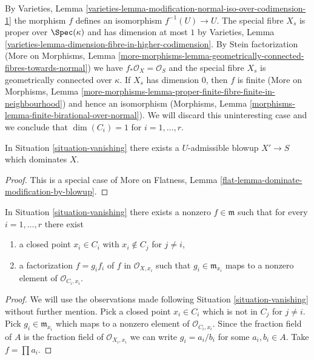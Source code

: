 \noindent
By Varieties, Lemma
\ref{varieties-lemma-modification-normal-iso-over-codimension-1}
the morphism $f$ defines an isomorphism $f^{-1}(U) \to U$.
The special fibre $X_s$ is proper over $\Spec(\kappa)$ and
has dimension at most $1$ by Varieties, Lemma
\ref{varieties-lemma-dimension-fibre-in-higher-codimension}.
By Stein factorization (More on Morphisms, Lemma
\ref{more-morphisms-lemma-geometrically-connected-fibres-towards-normal})
we have $f_*\mathcal{O}_X = \mathcal{O}_S$ and
the special fibre $X_s$ is geometrically connected over $\kappa$.
If $X_s$ has dimension $0$, then $f$ is finite
(More on Morphisms, Lemma
\ref{more-morphisms-lemma-proper-finite-fibre-finite-in-neighbourhood})
and hence an isomorphism
(Morphisms, Lemma \ref{morphisms-lemma-finite-birational-over-normal}).
We will discard this uninteresting case and we conclude that
$\dim(C_i) = 1$ for $i = 1, \ldots, r$.

\begin{lemma}
\label{lemma-dominate-by-scheme-modification}
In Situation \ref{situation-vanishing} there exists a $U$-admissible
blowup $X' \to S$ which dominates $X$.
\end{lemma}

\begin{proof}
This is a special case of
More on Flatness, Lemma \ref{flat-lemma-dominate-modification-by-blowup}.
\end{proof}

\begin{lemma}
\label{lemma-nice-meromorphic-function}
In Situation \ref{situation-vanishing} there exists a nonzero
$f \in \mathfrak m$ such that for every $i = 1, \ldots, r$ there exist
\begin{enumerate}
\item a closed point $x_i \in C_i$ with $x_i \not \in C_j$ for $j \not = i$,
\item a factorization $f = g_i f_i$ of $f$ in $\mathcal{O}_{X, x_i}$
such that $g_i \in \mathfrak m_{x_i}$ maps to a nonzero element
of $\mathcal{O}_{C_i, x_i}$.
\end{enumerate}
\end{lemma}

\begin{proof}
We will use the observations made following Situation \ref{situation-vanishing}
without further mention. Pick a closed point $x_i \in C_i$ which is not in
$C_j$ for $j \not = i$. Pick $g_i \in \mathfrak m_{x_i}$ which maps to a
nonzero element of $\mathcal{O}_{C_i, x_i}$. Since the fraction field of $A$
is the fraction field of $\mathcal{O}_{X_i, x_i}$ we can write
$g_i = a_i/b_i$ for some $a_i, b_i \in A$. Take $f = \prod a_i$.
\end{proof}

